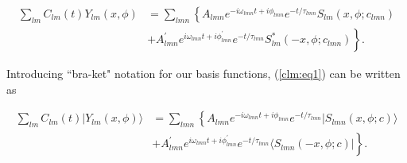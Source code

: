\documentclass[11pt]{article}
\newcommand{\bra}[1]{\langle #1|}
\newcommand{\ket}[1]{|#1\rangle}
\begin{document}
\begin{equation} \label{clm:eq1}
\begin{aligned}
\sum_{lm} C_{lm}(t) Y_{lm}(x, \phi) & = \sum_{lmn} \left \{ A_{lmn} e^{-i\omega_{lmn}t+i\phi_{lmn}}e^{-t/\tau_{lmn}} S_{lm}(x, \phi ;c_{lmn}) \right. \\
& \left. + A^{'}_{lmn} e^{i\omega_{lmn}t+i\phi^{'}_{lmn}}e^{-t/\tau_{lmn}} S^{*}_{lm}(-x, \phi; c_{lmn}) \right \}.
\end{aligned}
\end{equation}

\noindent
Introducing ``bra-ket" notation for our basis functions, (\ref{clm:eq1}) can be written as  

\begin{equation} \label{clm:eq2}
\begin{aligned}
\sum_{lm} C_{lm}(t) \ket{Y_{lm}(x, \phi)} & = \sum_{lmn} \left \{ A_{lmn} e^{-i\omega_{lmn}t+i\phi_{lmn}}e^{-t/\tau_{lmn}} \ket{S_{lmn}(x, \phi ;c)} \right. \\
& \left. + A^{'}_{lmn} e^{i\omega_{lmn}t+i\phi^{'}_{lmn}}e^{-t/\tau_{lmn}} \bra{S_{lmn}(-x, \phi; c)} \right \}.
\end{aligned}
\end{equation}
\end{document}
